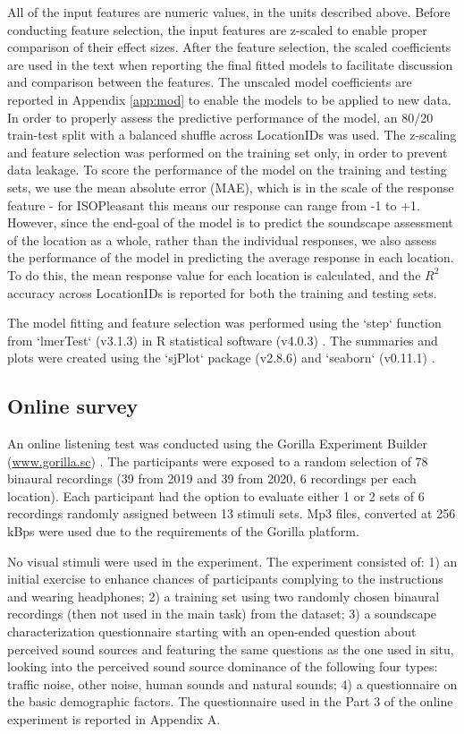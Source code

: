 All of the input features are numeric values, in the units described above. Before conducting feature selection, the input features are z-scaled to enable proper comparison of their effect sizes. After the feature selection, the scaled coefficients are used in the text when reporting the final fitted models to facilitate discussion and comparison between the features. The unscaled model coefficients are reported in Appendix \ref{app:mod} to enable the models to be applied to new data. In order to properly assess the predictive performance of the model, an 80/20 train-test split with a balanced shuffle across LocationIDs was used. The z-scaling and feature selection was performed on the training set only, in order to prevent data leakage. To score the performance of the model on the training and testing sets, we use the mean absolute error (MAE), which is in the scale of the response feature - for ISOPleasant this means our response can range from -1 to +1. However, since the end-goal of the model is to predict the soundscape assessment of the location as a whole, rather than the individual responses, we also assess the performance of the model in predicting the average response in each location. To do this, the mean response value for each location is calculated, and the $R^2$ accuracy across LocationIDs is reported for both the training and testing sets.

The model fitting and feature selection was performed using the `step` function from `lmerTest` (v3.1.3) \citep{lmertest2017} in R statistical software (v4.0.3) \citep{Rstats2020}. The summaries and plots were created using the `sjPlot` package (v2.8.6) \citep{sjPlot2021} and `seaborn` (v0.11.1) \citep{Waskom2021}.

\subsection{Online survey}

An online listening test was conducted using the Gorilla Experiment Builder (\url{www.gorilla.sc}) \citep{anwyl2020gorilla}. The participants were exposed to a random selection of 78 binaural recordings (39 from 2019 and 39 from 2020, 6 recordings per each location). Each participant had the option to evaluate either 1 or 2 sets of 6 recordings randomly assigned between 13 stimuli sets. Mp3 files, converted at 256 kBps were used due to the requirements of the Gorilla platform.

No visual stimuli were used in the experiment. The experiment consisted of: 1) an initial exercise to enhance chances of participants complying to the instructions and wearing headphones; 2) a training set using two randomly chosen binaural recordings (then not used in the main task) from the dataset; 3) a soundscape characterization questionnaire starting with an open-ended question about perceived sound sources and featuring the same questions as the one used in situ, looking into the perceived sound source dominance of the following four types: traffic noise, other noise, human sounds and natural sounds; 4) a questionnaire on the basic demographic factors. The questionnaire used in the Part 3 of the online experiment is reported in Appendix A.

